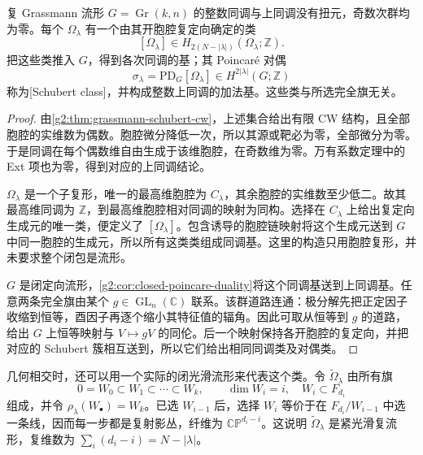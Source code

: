\begin{proposition}\label{g2:prop:schubert-integral-basis}
	复 Grassmann 流形 \(G=\operatorname{Gr}(k,n)\) 的整数同调与上同调没有扭元，奇数次群均为零。每个 \(\Omega_\lambda\) 有一个由其开胞腔复定向确定的类
	\[
		[\Omega_\lambda]\in H_{2(N-|\lambda|)}(\Omega_\lambda;\mathbb Z).
	\]
	把这些类推入 \(G\)，得到各次同调的基；其 Poincar\'e 对偶
	\begin{equation}\label{g2:eq:schubert-class-definition}
		\sigma_\lambda=\mathrm{PD}_G[\Omega_\lambda]\in H^{2|\lambda|}(G;\mathbb Z)
	\end{equation}
	称为[Schubert class]，并构成整数上同调的加法基。这些类与所选完全旗无关。
\end{proposition}
\begin{proof}
	由\cref{g2:thm:grassmann-schubert-cw}，上述集合给出有限 CW 结构，且全部胞腔的实维数为偶数。胞腔微分降低一次，所以其源或靶必为零，全部微分为零。于是同调在每个偶数维自由生成于该维胞腔，在奇数维为零。万有系数定理中的 Ext 项也为零，得到对应的上同调结论。

	\(\Omega_\lambda\) 是一个子复形，唯一的最高维胞腔为 \(C_\lambda\)，其余胞腔的实维数至少低二。故其最高维同调为 \(\mathbb Z\)，到最高维胞腔相对同调的映射为同构。选择在 \(C_\lambda\) 上给出复定向生成元的唯一类，便定义了 \([\Omega_\lambda]\)。包含诱导的胞腔链映射将这个生成元送到 \(G\) 中同一胞腔的生成元，所以所有这类类组成同调基。这里的构造只用胞腔复形，并未要求整个闭包是流形。

	\(G\) 是闭定向流形，\cref{g2:cor:closed-poincare-duality}将这个同调基送到上同调基。任意两条完全旗由某个 \(g\in\operatorname{GL}_n(\mathbb C)\) 联系。该群道路连通：极分解先把正定因子收缩到恒等，酉因子再逐个缩小其特征值的辐角。因此可取从恒等到 \(g\) 的道路，给出 \(G\) 上恒等映射与 \(V\mapsto gV\) 的同伦。后一个映射保持各开胞腔的复定向，并把对应的 Schubert 簇相互送到，所以它们给出相同同调类及对偶类。
\end{proof}

几何相交时，还可以用一个实际的闭光滑流形来代表这个类。令 \(\widetilde\Omega_\lambda\) 由所有旗
\[
	0=W_0\subset W_1\subset\cdots\subset W_k,
	\qquad\dim W_i=i,\quad W_i\subset F_{d_i}
\]
组成，并令 \(\rho_\lambda(W_\bullet)=W_k\)。已选 \(W_{i-1}\) 后，选择 \(W_i\) 等价于在 \(F_{d_i}/W_{i-1}\) 中选一条线，因而每一步都是复射影丛，纤维为 \(\mathbb{CP}^{d_i-i}\)。这说明 \(\widetilde\Omega_\lambda\) 是紧光滑复流形，复维数为 \(\sum_i(d_i-i)=N-|\lambda|\)。

